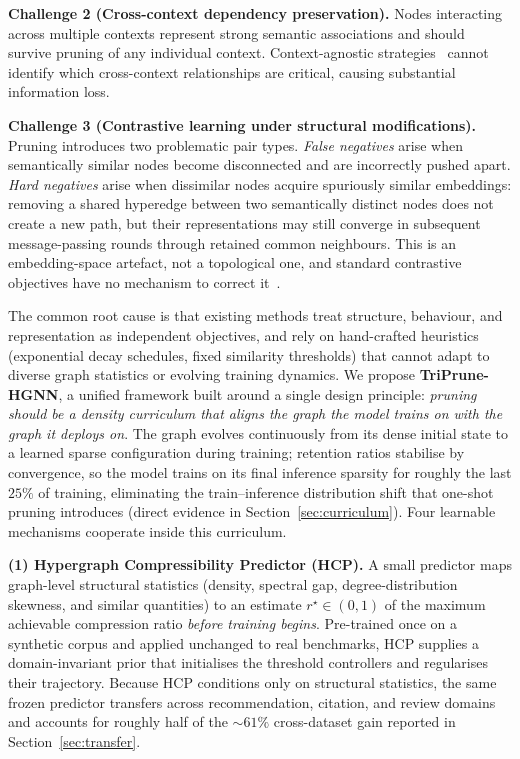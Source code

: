 \documentclass[10pt]{article}
\theoremstyle{plain}
\theoremstyle{definition}
\begin{document}
\textbf{Challenge 2 (Cross-context dependency preservation).} Nodes interacting across multiple contexts represent strong semantic associations and should survive pruning of any individual context. Context-agnostic strategies~\citep{liang2021pruning} cannot identify which cross-context relationships are critical, causing substantial information loss.

\textbf{Challenge 3 (Contrastive learning under structural modifications).} Pruning introduces two problematic pair types. \emph{False negatives} arise when semantically similar nodes become disconnected and are incorrectly pushed apart. \emph{Hard negatives} arise when dissimilar nodes acquire spuriously similar embeddings: removing a shared hyperedge between two semantically distinct nodes does not create a new path, but their representations may still converge in subsequent message-passing rounds through retained common neighbours. This is an embedding-space artefact, not a topological one, and standard contrastive objectives have no mechanism to correct it~\citep{wu2024uncovering}.

The common root cause is that existing methods treat structure, behaviour, and representation as independent objectives, and rely on hand-crafted heuristics (exponential decay schedules, fixed similarity thresholds) that cannot adapt to diverse graph statistics or evolving training dynamics. We propose \textbf{TriPrune-HGNN}, a unified framework built around a single design principle: \emph{pruning should be a density curriculum that aligns the graph the model trains on with the graph it deploys on}. The graph evolves continuously from its dense initial state to a learned sparse configuration during training; retention  ratios stabilise by convergence, so the model trains on its final inference sparsity for roughly the last $25\%$ of training, eliminating the train--inference distribution shift that one-shot pruning introduces (direct evidence in Section~\ref{sec:curriculum}). Four learnable mechanisms cooperate inside this curriculum.

\textbf{(1) Hypergraph Compressibility Predictor (HCP).} A small predictor maps graph-level structural statistics (density, spectral gap, degree-distribution skewness, and similar quantities) to an estimate $r^{\star}\!\in\!(0,1)$ of the maximum achievable compression ratio \emph{before training begins}. Pre-trained once on a synthetic corpus and applied unchanged to real benchmarks, HCP supplies a domain-invariant prior that initialises the threshold controllers and regularises their trajectory. Because HCP conditions only on structural statistics, the same frozen predictor transfers across recommendation, citation, and review domains and accounts for roughly half of the $\sim\!61\%$ cross-dataset gain reported in Section~\ref{sec:transfer}.
\end{document}
